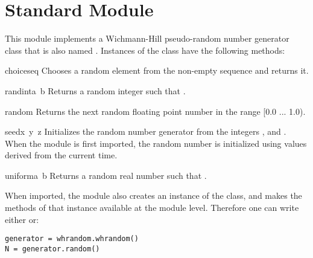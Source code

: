 \section{Standard Module }
\label{module-whrandom}

This module implements a Wichmann-Hill pseudo-random number generator
class that is also named .  Instances of the
 class have the following methods:

\begin{funcdesc}{choice}{seq}
Chooses a random element from the non-empty sequence  and returns it.
\end{funcdesc}

\begin{funcdesc}{randint}{a\, b}
Returns a random integer  such that .
\end{funcdesc}

\begin{funcdesc}{random}{}
Returns the next random floating point number in the range [0.0 ... 1.0).
\end{funcdesc}

\begin{funcdesc}{seed}{x\, y\, z}
Initializes the random number generator from the integers
,
and
.
When the module is first imported, the random number is initialized
using values derived from the current time.
\end{funcdesc}

\begin{funcdesc}{uniform}{a\, b}
Returns a random real number  such that .
\end{funcdesc}

When imported, the  module also creates an instance of
the  class, and makes the methods of that instance
available at the module level.  Therefore one can write either 
 or:
\begin{verbatim}
generator = whrandom.whrandom()
N = generator.random()
\end{verbatim}
%
\begin{seealso}
\end{seealso}
